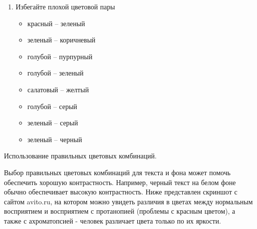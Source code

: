 \begin{enumerate}
\item Избегайте плохой цветовой пары

    \begin{itemize}
        \item красный – зеленый
        \item зеленый – коричневый
        \item голубой – пурпурный
        \item голубой – зеленый
        \item салатовый – желтый
        \item голубой – серый
        \item зеленый – серый
        \item зеленый – черный
    \end{itemize}

\end{enumerate}
\bigskip

Использование правильных цветовых комбинаций.

Выбор правильных цветовых комбинаций для текста и фона может помочь обеспечить хорошую контрастность. Например, черный текст на белом фоне обычно обеспечивает высокую контрастность.
Ниже представлен скриншот с сайтом  avito.ru, на котором можно увидеть различия в цветах между нормальным восприятием и восприятием с протанопией (проблемы с красным цветом), а также с ахроматопсией - человек различает цвета только по их яркости.
\bigskip

\noindent
\begin{minipage}{\linewidth}
\end{minipage}
\bigskip

\noindent
\begin{minipage}{\linewidth}
\end{minipage}
\bigskip

